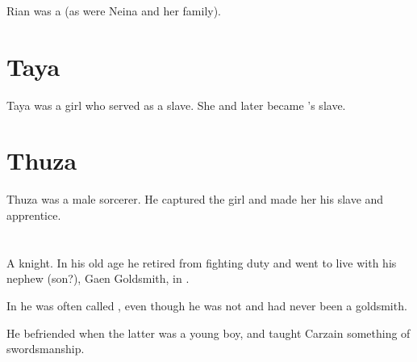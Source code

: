 \subsubsection{\Tulan}
Rian was a  (as were Neina and her family).















\section{Taya}
Taya was a \human girl who served  as a slave.
She  and later became \Shachar's slave. 















\section{Thuza}
Thuza was a male \human sorcerer. 
He captured the girl  and made her his slave and apprentice.















\section[Weylon]{\Rah{\Weylon}}
\index{\rah[\Weylon]}
A  knight.
In his old age he retired from fighting duty and went to live with his nephew (son?), Gaen Goldsmith, in . 

In \Redglen{} he was often called , even though he was not and had never been a goldsmith. 

He befriended  when the latter was a young boy, and taught Carzain something of swordsmanship. 















